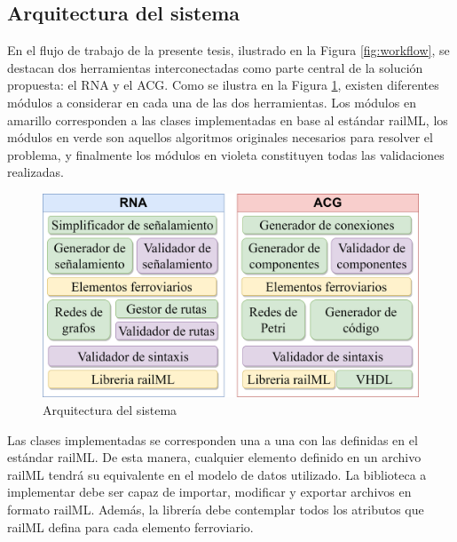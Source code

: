 \subsection{Arquitectura del sistema}

	En el flujo de trabajo de la presente tesis, ilustrado en la Figura \ref{fig:workflow}, se destacan dos herramientas interconectadas como parte central de la solución propuesta: el RNA y el ACG. Como se ilustra en la Figura \ref{fig:architecture}, existen diferentes módulos a considerar en cada una de las dos herramientas. Los módulos en amarillo corresponden a las clases implementadas en base al estándar railML, los módulos en verde son aquellos algoritmos originales necesarios para resolver el problema, y finalmente los módulos en violeta constituyen todas las validaciones realizadas. %

    \begin{figure}[H]
        \centering
        \includegraphics[width=1\textwidth]{Figuras/Architecture.png}
        \centering\caption{Arquitectura del sistema}
        \label{fig:architecture}
    \end{figure}

    Las clases implementadas se corresponden una a una con las definidas en el estándar railML. De esta manera, cualquier elemento definido en un archivo railML tendrá su equivalente en el modelo de datos utilizado. La biblioteca a implementar debe ser capaz de importar, modificar y exportar archivos en formato railML. Además, la librería debe contemplar todos los atributos que railML defina para cada elemento ferroviario.

